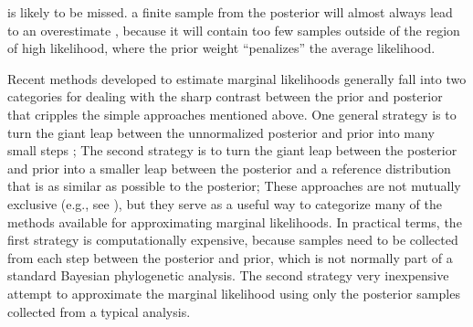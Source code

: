 is likely to be missed.
 a finite sample from the posterior will almost always lead to an
overestimate \citep{Lartillot2006,Xie2011,Fan2011}, because it will contain too
few samples outside of the region of high likelihood, where the prior weight
``penalizes'' the average likelihood.

Recent methods developed to estimate marginal likelihoods generally fall into
two categories for dealing with the sharp contrast between the prior and
posterior that cripples the simple approaches mentioned above.
One general strategy is to turn the giant leap between the unnormalized
posterior and prior into many small steps ;
The second strategy is to turn the giant leap between the posterior and prior
into a smaller leap between the posterior and a reference distribution that is
as similar as possible to the posterior;
These approaches are not mutually exclusive (e.g., see \citet{Fan2011}), but
they serve as a useful way to categorize many of the methods available for
approximating marginal likelihoods.
In practical terms, the first strategy is computationally expensive, because
samples need to be collected from each step between the posterior and prior,
which is not normally part of a standard Bayesian phylogenetic analysis.
The second strategy  very inexpensive  attempt to approximate the
marginal likelihood using only the posterior samples collected from a
typical analysis.

